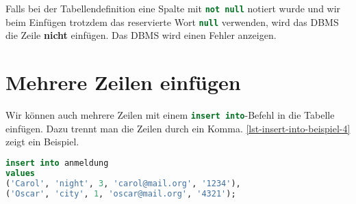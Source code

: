 \begin{important}
Falls bei der Tabellendefinition eine Spalte mit \lstinline[language=sql]{not null} notiert wurde und wir beim Einfügen trotzdem das reservierte Wort \lstinline[language=sql]{null} verwenden, wird das \ac{DBMS} die Zeile \textbf{nicht} einfügen. Das \ac{DBMS} wird einen Fehler anzeigen.
\end{important}

\section{Mehrere Zeilen einfügen}

Wir können auch mehrere Zeilen mit einem \lstinline[language=sql]{insert into}-Befehl in die Tabelle einfügen. Dazu trennt man die Zeilen durch ein Komma. \autoref{lst-insert-into-beispiel-4} zeigt ein Beispiel.

\begin{lstlisting}[language=SQL, upquote=true, morekeywords={real, text}, caption={Es werden zwei Zeilen in die Tabelle eingefügt.}, label	={lst-insert-into-beispiel-4}]
insert into anmeldung 
values 
('Carol', 'night', 3, 'carol@mail.org', '1234'),
('Oscar', 'city', 1, 'oscar@mail.org', '4321');
\end{lstlisting}